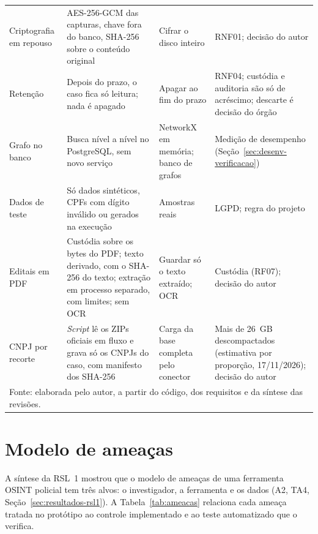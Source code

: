 \begin{small}
\begin{longtable}{p{2.6cm}p{4.4cm}p{3.6cm}p{3.6cm}}
Criptografia em repouso & AES-256-GCM das capturas, chave fora do banco, SHA-256 sobre o conteúdo original & Cifrar o disco inteiro & RNF01; decisão do autor \\
Retenção & Depois do prazo, o caso fica só leitura; nada é apagado & Apagar ao fim do prazo & RNF04; custódia e auditoria são só de acréscimo; descarte é decisão do órgão \\
Grafo no banco & Busca nível a nível no PostgreSQL, sem novo serviço & NetworkX em memória; banco de grafos & Medição de desempenho (Seção~\ref{sec:desenv-verificacao}) \\
Dados de teste & Só dados sintéticos, CPFs com dígito inválido ou gerados na execução & Amostras reais & LGPD; regra do projeto \\
Editais em PDF & Custódia sobre os bytes do PDF; texto derivado, com o SHA-256 do texto; extração em processo separado, com limites; sem OCR & Guardar só o texto extraído; OCR & Custódia (RF07); decisão do autor \\
CNPJ por recorte & \textit{Script} lê os ZIPs oficiais em fluxo e grava só os CNPJs do caso, com manifesto dos SHA-256 & Carga da base completa pelo conector & Mais de 26~GB descompactados (estimativa por proporção, 17/11/2026); decisão do autor \\
\hline
\multicolumn{4}{p{14.6cm}}{\footnotesize Fonte: elaborada pelo autor, a partir do código, dos requisitos e da síntese das revisões.}\\
\end{longtable}
\end{small}

\section{Modelo de ameaças}
\label{sec:desenv-ameacas}

A síntese da RSL~1 mostrou que o modelo de ameaças de uma ferramenta OSINT
policial tem três alvos: o investigador, a ferramenta e os dados (A2, TA4,
Seção~\ref{sec:resultados-rsl1}). A Tabela~\ref{tab:ameacas} relaciona cada
ameaça tratada no protótipo ao controle implementado e ao teste automatizado
que o verifica.

